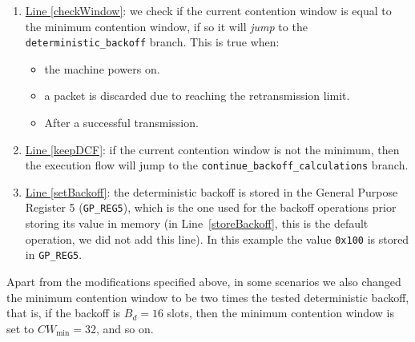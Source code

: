 \documentclass[a4paper]{journal}
\begin{document}
\begin{enumerate}
	\item \underline{Line \ref{checkWindow}}: we check if the current contention window is equal to the minimum contention window, if so it will \emph{jump} to the {\texttt{deterministic\_backoff}} branch. This is true when:
	\begin{itemize}
		\item the machine powers on.
		\item a packet is discarded due to reaching the retransmission limit.
		\item After a successful transmission.
	\end{itemize}
	\item \underline{Line \ref{keepDCF}}: if the current contention window is not the minimum, then the execution flow will jump to the {\texttt {continue\_backoff\_calculations}} branch.
	\item \underline{Line \ref{setBackoff}}: the deterministic backoff is stored in the General Purpose Register 5 ({\texttt{GP\_REG5}}), which is the one used for the backoff operations prior storing its value in memory (in Line~\ref{storeBackoff}, this is the default operation, we did not add this line). In this example the value {\texttt{0x100}} is stored in {\texttt{GP\_REG5}}.
\end{enumerate}

Apart from the modifications specified above, in some scenarios we also changed the minimum contention window to be two times the tested deterministic backoff, that is, if the backoff is $B_{d}=16$ slots, then the minimum contention window is set to $CW_{\min}=32$, and so on.
\end{document}
